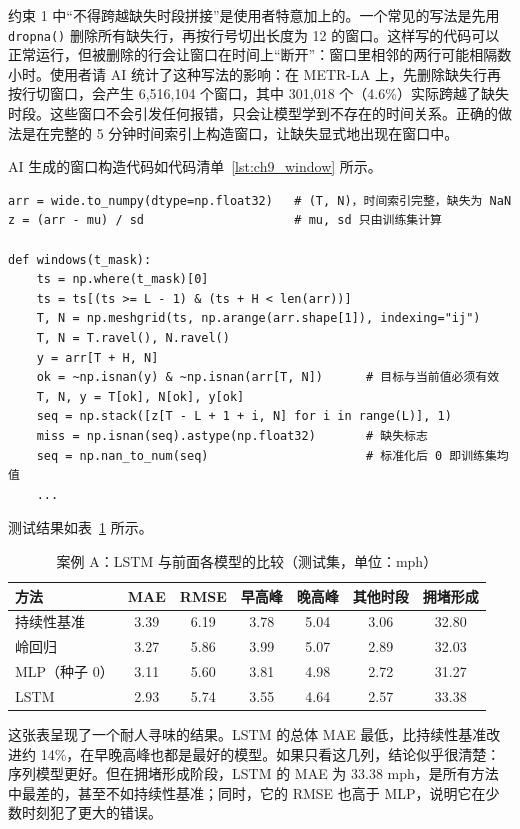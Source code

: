 约束 1 中“不得跨越缺失时段拼接”是使用者特意加上的。一个常见的写法是先用 \texttt{dropna()} 删除所有缺失行，再按行号切出长度为 12 的窗口。这样写的代码可以正常运行，但被删除的行会让窗口在时间上“断开”：窗口里相邻的两行可能相隔数小时。使用者请 AI 统计了这种写法的影响：在 METR-LA 上，先删除缺失行再按行切窗口，会产生 6,516,104 个窗口，其中 301,018 个（4.6\%）实际跨越了缺失时段。这些窗口不会引发任何报错，只会让模型学到不存在的时间关系。正确的做法是在完整的 5 分钟时间索引上构造窗口，让缺失显式地出现在窗口中。

AI 生成的窗口构造代码如代码清单~\ref{lst:ch9_window} 所示。

\begin{lstlisting}[caption={案例 A：在完整时间索引上构造 LSTM 输入（节选）},label={lst:ch9_window}]
arr = wide.to_numpy(dtype=np.float32)   # (T, N)，时间索引完整，缺失为 NaN
z = (arr - mu) / sd                     # mu, sd 只由训练集计算

def windows(t_mask):
    ts = np.where(t_mask)[0]
    ts = ts[(ts >= L - 1) & (ts + H < len(arr))]
    T, N = np.meshgrid(ts, np.arange(arr.shape[1]), indexing="ij")
    T, N = T.ravel(), N.ravel()
    y = arr[T + H, N]
    ok = ~np.isnan(y) & ~np.isnan(arr[T, N])      # 目标与当前值必须有效
    T, N, y = T[ok], N[ok], y[ok]
    seq = np.stack([z[T - L + 1 + i, N] for i in range(L)], 1)
    miss = np.isnan(seq).astype(np.float32)       # 缺失标志
    seq = np.nan_to_num(seq)                      # 标准化后 0 即训练集均值
    ...
\end{lstlisting}

测试结果如表~\ref{tab:ch9_lstm} 所示。

\begin{table}[H]
\centering
\caption{案例 A：LSTM 与前面各模型的比较（测试集，单位：mph）}
\label{tab:ch9_lstm}
\begin{tabular}{lcccccc}
\toprule
方法 & MAE & RMSE & 早高峰 & 晚高峰 & 其他时段 & 拥堵形成 \\
\midrule
持续性基准 & 3.39 & 6.19 & 3.78 & 5.04 & 3.06 & 32.80 \\
岭回归 & 3.27 & 5.86 & 3.99 & 5.07 & 2.89 & 32.03 \\
MLP（种子 0） & 3.11 & 5.60 & 3.81 & 4.98 & 2.72 & 31.27 \\
LSTM & 2.93 & 5.74 & 3.55 & 4.64 & 2.57 & 33.38 \\
\bottomrule
\end{tabular}
\end{table}

这张表呈现了一个耐人寻味的结果。LSTM 的总体 MAE 最低，比持续性基准改进约 14\%，在早晚高峰也都是最好的模型。如果只看这几列，结论似乎很清楚：序列模型更好。但在拥堵形成阶段，LSTM 的 MAE 为 33.38 mph，是所有方法中最差的，甚至不如持续性基准；同时，它的 RMSE 也高于 MLP，说明它在少数时刻犯了更大的错误。

